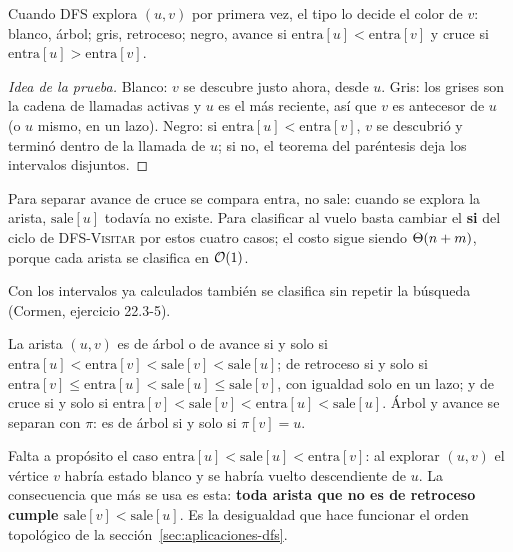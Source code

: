 \documentclass[11pt,letterpaper]{article}
\begin{document}
\begin{proposicion}
  \label{prop:busq-clasificacion}
  Cuando DFS explora $(u, v)$ por primera vez, el tipo lo decide el
  color de $v$: blanco, árbol; gris, retroceso; negro, avance si
  $\text{entra}[u] < \text{entra}[v]$ y cruce si
  $\text{entra}[u] > \text{entra}[v]$.
\end{proposicion}

\begin{proof}[Idea de la prueba]
  Blanco: $v$ se descubre justo ahora, desde $u$. Gris: los grises son
  la cadena de llamadas activas y $u$ es el más reciente, así que $v$
  es antecesor de $u$ (o $u$ mismo, en un lazo). Negro: si
  $\text{entra}[u] < \text{entra}[v]$, $v$ se descubrió y terminó
  dentro de la llamada de $u$; si no, el teorema del paréntesis deja
  los intervalos disjuntos.
\end{proof}

Para separar avance de cruce se compara $\text{entra}$, no
$\text{sale}$: cuando se explora la arista, $\text{sale}[u]$ todavía
no existe. Para clasificar al vuelo basta cambiar el \textbf{si} del
ciclo de \textsc{DFS-Visitar} por estos cuatro casos; el costo sigue
siendo $\Theta\!\left(n + m\right)$, porque cada arista se clasifica en $\mathcal{O}\!\left(1\right)$.

Con los intervalos ya calculados también se clasifica sin repetir la
búsqueda (Cormen, ejercicio 22.3-5).

\begin{proposicion}
  \label{prop:busq-intervalos}
  La arista $(u, v)$ es de árbol o de avance si y solo si
  $\text{entra}[u] < \text{entra}[v] < \text{sale}[v] < \text{sale}[u]$;
  de retroceso si y solo si
  $\text{entra}[v] \leq \text{entra}[u] < \text{sale}[u] \leq
  \text{sale}[v]$, con igualdad solo en un lazo; y de cruce si y solo
  si $\text{entra}[v] < \text{sale}[v] < \text{entra}[u] <
  \text{sale}[u]$. Árbol y avance se separan con $\pi$: es de árbol si
  y solo si $\pi[v] = u$.
\end{proposicion}

Falta a propósito el caso
$\text{entra}[u] < \text{sale}[u] < \text{entra}[v]$: al explorar
$(u, v)$ el vértice $v$ habría estado blanco y se habría vuelto
descendiente de $u$. La consecuencia que más se usa es esta:
\textbf{toda arista que no es de retroceso cumple
$\text{sale}[v] < \text{sale}[u]$}. Es la desigualdad que hace
funcionar el orden topológico de la sección~\ref{sec:aplicaciones-dfs}.
\end{document}
